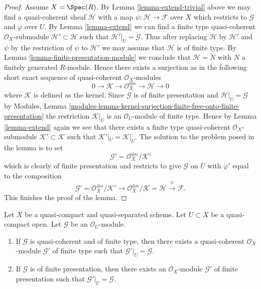 \begin{proof}
\medskip\noindent
Assume $X = \Spec(R)$.
By Lemma \ref{lemma-extend-trivial} above we may
find a quasi-coherent sheaf $\mathcal{H}$ with
a map $\psi : \mathcal{H} \to \mathcal{F}$ over $X$
which restricts to $\mathcal{G}$ and $\varphi$ over $U$.
By Lemma \ref{lemma-extend} we can find a finite type
quasi-coherent $\mathcal{O}_X$-submodule
$\mathcal{H}' \subset \mathcal{H}$
such that $\mathcal{H}'|_U = \mathcal{G}$. Thus after
replacing $\mathcal{H}$ by $\mathcal{H}'$
and $\psi$ by the restriction of $\psi$ to $\mathcal{H}'$
we may assume that $\mathcal{H}$ is of finite type.
By Lemma \ref{lemma-finite-presentation-module}
we conclude that $\mathcal{H} = \widetilde{N}$ with
$N$ a finitely generated $R$-module. Hence there exists a surjection
as in the following short exact sequence of
quasi-coherent $\mathcal{O}_X$-modules
$$
0 \to \mathcal{K} \to \mathcal{O}_X^{\oplus n} \to \mathcal{H} \to 0
$$
where $\mathcal{K}$ is defined as the kernel.
Since $\mathcal{G}$ is of finite presentation and
$\mathcal{H}|_U = \mathcal{G}$ by
Modules, Lemma
\ref{modules-lemma-kernel-surjection-finite-free-onto-finite-presentation}
the restriction $\mathcal{K}|_U$ is
an $\mathcal{O}_U$-module of finite type. Hence by Lemma \ref{lemma-extend}
again we see that there exists a finite type quasi-coherent
$\mathcal{O}_X$-submodule $\mathcal{K}' \subset \mathcal{K}$ such
that $\mathcal{K}'|_U = \mathcal{K}|_U$. The solution to the problem
posed in the lemma is to set
$$
\mathcal{G}' = \mathcal{O}_X^{\oplus n}/\mathcal{K}'
$$
which is clearly of finite presentation and restricts to give $\mathcal{G}$
on $U$ with $\varphi'$ equal to the composition
$$
\mathcal{G}' = \mathcal{O}_X^{\oplus n}/\mathcal{K}'
\to \mathcal{O}_X^{\oplus n}/\mathcal{K} = \mathcal{H} \xrightarrow{\psi}
\mathcal{F}.
$$
This finishes the proof of the lemma.
\end{proof}

\begin{lemma}
\label{lemma-lift-finite-presentation}
Let $X$ be a quasi-compact and quasi-separated scheme. Let $U \subset X$
be a quasi-compact open. Let $\mathcal{G}$ be an $\mathcal{O}_U$-module.
\begin{enumerate}
\item If $\mathcal{G}$ is quasi-coherent and of finite type, then
there exists a quasi-coherent $\mathcal{O}_X$-module $\mathcal{G}'$
of finite type such that $\mathcal{G}'|_U = \mathcal{G}$.
\item If $\mathcal{G}$ is of finite presentation, then
there exists an $\mathcal{O}_X$-module $\mathcal{G}'$
of finite presentation such that $\mathcal{G}'|_U = \mathcal{G}$.
\end{enumerate}
\end{lemma}

